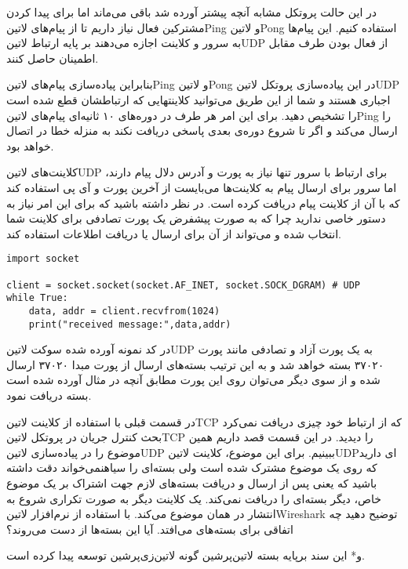 \documentclass[]{article}
\begin{document}

  در این حالت پروتکل مشابه آنچه پیشتر آورده شد باقی می‌ماند اما برای پیدا کردن مشترکین فعال نیاز داریم تا از پیام‌های
  ‌لاتین{Ping} و ‌لاتین{Pong} استفاده کنیم. این پیام‌ها به سرور و کلاینت اجازه می‌دهند بر پایه ارتباط ‌لاتین{UDP}
  از فعال بودن طرف مقابل اطمینان حاصل کنند.

  بنابراین پیاده‌سازی پیام‌های ‌لاتین{Ping} و ‌لاتین{Pong} در این پیاده‌سازی پروتکل ‌لاتین{UDP} اجباری هستند
  و شما از این طریق می‌توانید کلاینتهایی که ارتباطشان قطع شده است را تشخیص دهید. برای این امر هر طرف در دوره‌های ۱۰
  ثانیه‌ای پیام‌های ‌لاتین{Ping} را ارسال می‌کند و اگر تا شروع دوره‌ی بعدی پاسخی دریافت نکند به منزله خطا در اتصال خواهد بود.


  کلاینت‌های ‌لاتین{UDP} برای ارتباط با سرور تنها نیاز به پورت و آدرس دلال پیام دارند، اما سرور برای ارسال پیام به کلاینت‌ها
  می‌بایست از آخرین پورت و آی پی استفاده کند که با آن از کلاینت پیام دریافت کرده است. در نظر داشته باشید که برای این امر
  نیاز به دستور خاصی ندارید چرا که به صورت پیشفرض یک پورت تصادفی برای کلاینت شما انتخاب شده و می‌تواند از آن برای ارسال
  یا دریافت اطلاعات استفاده کند.

  \begin{latin}
  \begin{verbatim}
import socket

client = socket.socket(socket.AF_INET, socket.SOCK_DGRAM) # UDP
while True:
    data, addr = client.recvfrom(1024)
    print("received message:",data,addr)
  \end{verbatim}
  \end{latin}

  در کد نمونه آورده شده سوکت ‌لاتین{UDP} به یک پورت آزاد و تصادفی مانند پورت ۳۷۰۲۰ بسته خواهد شد و به این ترتیب بسته‌های ارسال از پورت مبدا ۳۷۰۲۰ ارسال شده
  و از سوی دیگر می‌توان روی این پورت مطابق آنچه در مثال آورده شده است بسته دریافت نمود.


  در قسمت قبلی با استفاده از کلاینت ‌لاتین{TCP} که از ارتباط خود چیزی دریافت نمی‌کرد بحث کنترل جریان
  در پروتکل ‌لاتین{TCP} را دیدید. در این قسمت قصد داریم همین موضوع را در پیاده‌سازی ‌لاتین{UDP} ببینیم.
  برای این موضوع، کلاینت ‌لاتین{UDP}ای دارید که روی یک موضوع مشترک شده است ولی بسته‌ای را ‌سیاه{نمی‌خواند}
  دقت داشته باشید که یعنی پس از ارسال و دریافت بسته‌های لازم جهت اشتراک بر یک موضوع خاص، دیگر بسته‌ای را دریافت نمی‌کند.
  یک کلاینت دیگر به صورت تکراری شروع به انتشار در همان موضوع می‌کند.
  با استفاده از نرم‌افزار ‌لاتین{Wireshark} توضیح دهید چه اتفاقی برای بسته‌های می‌افتد. آیا این بسته‌ها از دست می‌روند؟

  ‌و*{}
این سند برپایه بسته ‌لاتین{‌پرشین} گونه ‌لاتین{‌زی‌پرشین} توسعه پیدا کرده است.
\end{document}
